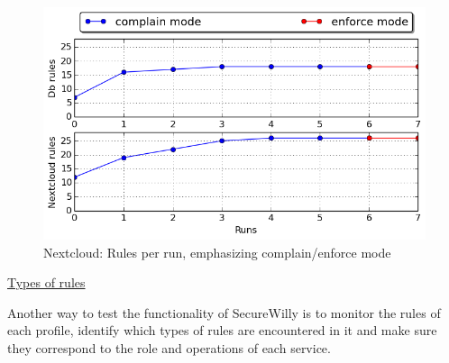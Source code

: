 \begin{figure}[h!]
  \centering
   \includegraphics[width=0.75\linewidth]{../figures/nextcloud/complain_enforce_rules.png}
   \caption{Nextcloud: Rules per run, emphasizing complain/enforce mode}
\end{figure}
\hfill\break
\hfill\break
\underline{Types of rules}
\hfill\break

Another way to test the functionality of SecureWilly is to monitor the rules of each profile, identify which types of rules are encountered in it and make sure they correspond to the role and operations of each service.


